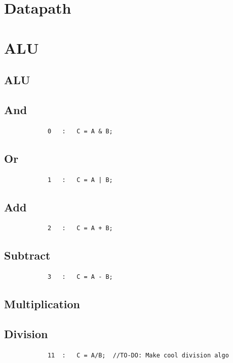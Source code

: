 \documentclass{article}
\begin{document}
\section{Datapath} \label{Datapath}
    
\section{ALU} \label{ALU}
    \subsection{ALU}
        
    \subsection{And}
        \begin{lstlisting}
            0   :   C = A & B;
        \end{lstlisting}
    \subsection{Or}
        \begin{lstlisting}
			1   :   C = A | B;
        \end{lstlisting}
    \subsection{Add}
        \begin{lstlisting}
            2   :   C = A + B;
        \end{lstlisting}
    \subsection{Subtract}
        \begin{lstlisting}
			3   :   C = A - B;
        \end{lstlisting}
    \subsection{Multiplication}
        
    \subsection{Division}
        \begin{lstlisting}
            11  :   C = A/B;  //TO-DO: Make cool division algo
        \end{lstlisting}
\end{document}
